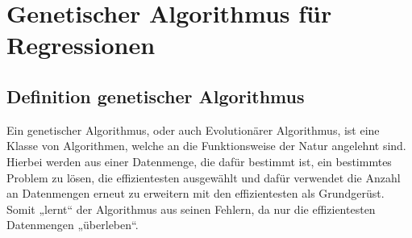 \documentclass[a4paper,12pt]{article}
\begin{document}
\section{Genetischer Algorithmus für Regressionen}
\subsection{Definition genetischer Algorithmus}
Ein genetischer Algorithmus, oder auch Evolutionärer Algorithmus, ist eine Klasse von Algorithmen, welche an die Funktionsweise der Natur angelehnt sind.\\
Hierbei werden aus einer Datenmenge, die dafür bestimmt ist, ein bestimmtes Problem zu lösen, die effizientesten ausgewählt und dafür verwendet die Anzahl an Datenmengen erneut zu erweitern mit  den effizientesten als Grundgerüst.\\ Somit „lernt“ der Algorithmus aus seinen Fehlern, da nur die effizientesten Datenmengen „überleben“. 
\end{document}
